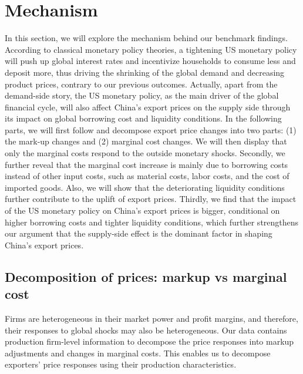 \section{Mechanism}

In this section, we will explore the mechanism behind our benchmark findings. According to classical monetary policy theories, a tightening US monetary policy will push up global interest rates and incentivize households to consume less and deposit more, thus driving the shrinking of the global demand and decreasing product prices, contrary to our previous outcomes. Actually, apart from the demand-side story, the US monetary policy, as the main driver of the global financial cycle, will also affect China's export prices on the supply side through its impact on global borrowing cost and liquidity conditions. In the following parts, we will first follow \cite{deloecker2012markups} and decompose export price changes into two parts: (1) the mark-up changes and (2) marginal cost changes. We will then display that only the marginal costs respond to the outside monetary shocks. Secondly, we further reveal that the marginal cost increase is mainly due to borrowing costs instead of other input costs, such as material costs, labor costs, and the cost of imported goods. Also, we will show that the deteriorating liquidity conditions further contribute to the uplift of export prices. Thirdly, we find that the impact of the US monetary policy on China's export prices is bigger, conditional on higher borrowing costs and tighter liquidity conditions, which further strengthens our argument that the supply-side effect is the dominant factor in shaping China's export prices.

\subsection{Decomposition of prices: markup vs marginal cost}

Firms are heterogeneous in their market power and profit margins, and therefore, their responses to global shocks may also be heterogeneous. Our data contains production firm-level information to decompose the price responses into markup adjustments and changes in marginal costs. This enables us to decompose exporters' price responses using their production characteristics.

